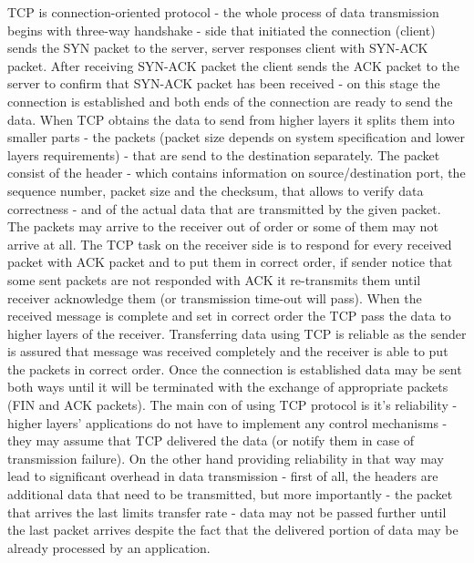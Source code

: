 \documentclass[magisterska,en]{pracamgr}
\begin{document}
TCP is connection-oriented protocol - the whole process of data transmission begins with three-way handshake - side that initiated the connection (client) sends the SYN packet to the server, server responses client with SYN-ACK packet. After receiving SYN-ACK packet the client sends the ACK packet to the server to confirm that SYN-ACK packet has been received - on this stage the connection is established and both ends of the connection are ready to send the data. When TCP obtains the data to send from higher layers it splits them into smaller parts - the packets (packet size depends on system specification and lower layers requirements) - that are send to the destination separately. The packet consist of the header - which contains information on source/destination port, the sequence number, packet size and the checksum, that allows to verify data correctness - and of the actual data that are transmitted by the given packet. The packets may arrive to the receiver out of order or some of them may not arrive at all. The TCP task on the receiver side is to respond for every received packet with ACK packet and to put them in correct order, if sender notice that some sent packets are not responded with ACK it re-transmits them until receiver acknowledge them (or transmission time-out will pass). When the received message is complete and set in correct order the TCP pass the data to higher layers of the receiver. Transferring data using TCP is reliable as the sender is assured that message was received completely and the receiver is able to put the packets in correct order. Once the connection is established data may be sent both ways until it will be terminated with the exchange of appropriate packets (FIN and ACK packets). The main con of using TCP protocol is it's reliability - higher layers' applications do not have to implement any control mechanisms - they may assume that TCP delivered the data (or notify them in case of transmission failure). On the other hand providing reliability in that way may lead to significant overhead in data transmission - first of all, the headers are additional data that need to be transmitted, but more importantly - the packet that arrives the last limits transfer rate - data may not be passed further until the last packet arrives despite the fact that the delivered portion of data may be already processed by an application. \cite{RFC_TCP}
\end{document}
